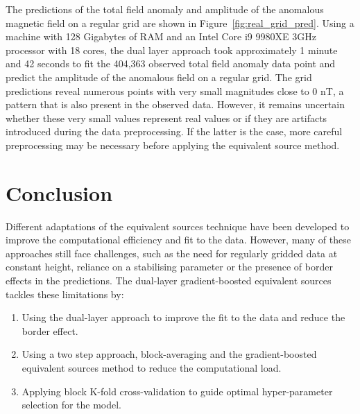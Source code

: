 The predictions of the total field anomaly and amplitude of the anomalous magnetic field on a regular grid are shown in Figure~\ref{fig:real_grid_pred}. Using a machine with 128 Gigabytes of RAM and an Intel Core i9 9980XE 3GHz processor with 18 cores, the dual layer approach took approximately 1 minute and 42 seconds to fit the 404,363 observed total field anomaly data point and predict the amplitude of the anomalous field on a regular grid. The grid predictions reveal numerous points with very small magnitudes close to 0 nT, a pattern that is also present in the observed data. However, it remains uncertain whether these very small values represent real values or if they are artifacts introduced during the data preprocessing. If the latter is the case, more careful preprocessing may be necessary before applying the equivalent source method.



\section{Conclusion}

Different adaptations of the equivalent sources technique have been developed to improve the computational efficiency and fit to the data. However, many of these approaches still face challenges, such as the need for regularly gridded data at constant height, reliance on a stabilising parameter or the presence of border effects in the predictions. The dual-layer gradient-boosted equivalent sources tackles these limitations by: 

\begin{enumerate}
    \item Using the dual-layer approach to improve the fit to the data and reduce the border effect.
    \item Using a two step approach, block-averaging and the gradient-boosted equivalent sources method to reduce the computational load.
    \item Applying block K-fold cross-validation to guide optimal hyper-parameter selection for the model.
\end{enumerate}

